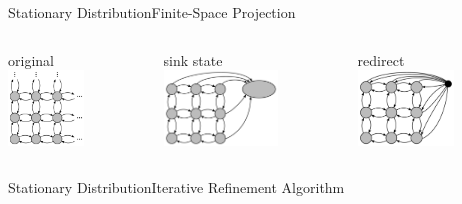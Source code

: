 \documentclass{beamer}
\begin{document}
\begin{frame}{Stationary Distribution}{Finite-Space Projection}
    \begin{columns}
        \begin{column}{.32\textwidth}
            \begin{center}
                original\\
                \vspace{4mm}
                \includegraphics[height=2cm]{../gfx/state_space_untrunc.pdf}
            \end{center}
        \end{column}
        \begin{column}{.32\textwidth}
            \begin{center}
                sink state\\
                \vspace{4mm}
                \includegraphics[height=2cm]{../gfx/state_space_redirected.pdf}
             \end{center}
        \end{column}
        \begin{column}{.32\textwidth}
            \begin{center}
                redirect\\
                \vspace{4mm}
                \includegraphics[height=2cm]{../gfx/state_space_reentry.pdf}
            \end{center}
        \end{column}
    \end{columns}
\end{frame}

\begin{frame}{Stationary Distribution}{Iterative Refinement Algorithm}
\end{frame}
\end{document}
